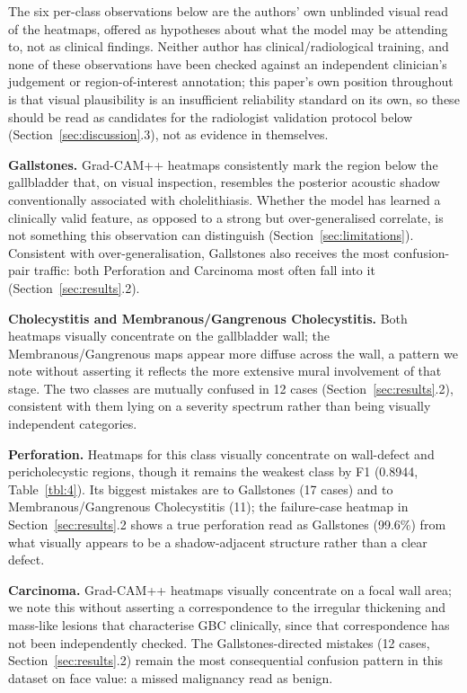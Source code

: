 The six per-class observations below are the authors' own unblinded visual read of the heatmaps, offered as hypotheses about what the model may be attending to, not as clinical findings. Neither author has clinical/radiological training, and none of these observations have been checked against an independent clinician's judgement or region-of-interest annotation; this paper's own position throughout is that visual plausibility is an insufficient reliability standard on its own, so these should be read as candidates for the radiologist validation protocol below (Section~\ref{sec:discussion}.3), not as evidence in themselves.

\textbf{Gallstones.} Grad-CAM++ heatmaps consistently mark the region below the gallbladder that, on visual inspection, resembles the posterior acoustic shadow conventionally associated with cholelithiasis. Whether the model has learned a clinically valid feature, as opposed to a strong but over-generalised correlate, is not something this observation can distinguish (Section~\ref{sec:limitations}). Consistent with over-generalisation, Gallstones also receives the most confusion-pair traffic: both Perforation and Carcinoma most often fall into it (Section~\ref{sec:results}.2).

\textbf{Cholecystitis and Membranous/Gangrenous Cholecystitis.} Both heatmaps visually concentrate on the gallbladder wall; the Membranous/Gangrenous maps appear more diffuse across the wall, a pattern we note without asserting it reflects the more extensive mural involvement of that stage. The two classes are mutually confused in 12 cases (Section~\ref{sec:results}.2), consistent with them lying on a severity spectrum rather than being visually independent categories.

\textbf{Perforation.} Heatmaps for this class visually concentrate on wall-defect and pericholecystic regions, though it remains the weakest class by F1 (0.8944, Table~\ref{tbl:4}). Its biggest mistakes are to Gallstones (17 cases) and to Membranous/Gangrenous Cholecystitis (11); the failure-case heatmap in Section~\ref{sec:results}.2 shows a true perforation read as Gallstones (99.6\%) from what visually appears to be a shadow-adjacent structure rather than a clear defect.

\textbf{Carcinoma.} Grad-CAM++ heatmaps visually concentrate on a focal wall area; we note this without asserting a correspondence to the irregular thickening and mass-like lesions that characterise GBC clinically, since that correspondence has not been independently checked. The Gallstones-directed mistakes (12 cases, Section~\ref{sec:results}.2) remain the most consequential confusion pattern in this dataset on face value: a missed malignancy read as benign.

